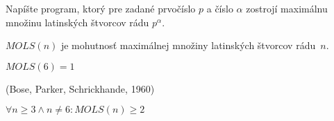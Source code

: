\begin{exercise}
Napíšte program, ktorý pre zadané prvočíslo $p$ a číslo $\alpha$ zostrojí maximálnu množinu latinských štvorcov rádu $p^\alpha$.
\end{exercise}


\begin{definition}
$MOLS(n)$ je mohutnosť maximálnej množiny latinských štvorcov rádu~$n$.
\end{definition}

\begin{remark}
$MOLS(6) = 1$
\end{remark}

\begin{theorem_hard}{(Bose, Parker, Schrickhande, 1960)}

$\forall n \geq 3 \wedge n \neq 6: MOLS(n) \geq 2$

\end{theorem_hard}

